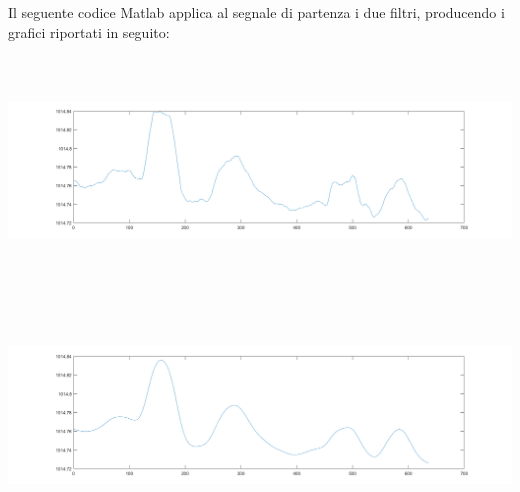 \documentclass[a4paper]{article}
\begin{document}
Il seguente codice Matlab applica al segnale di partenza i due filtri, producendo i grafici riportati in seguito: \\

\makebox[\linewidth]{}
\makebox[\linewidth]{}
\begin{minipage}{\linewidth}
\begin{center}
\includegraphics[width=160mm, height= 60mm]{./images/segnali/pressure_phone_movmean.png} 
\end{center}
\end{minipage}
\makebox[\linewidth]{}
\makebox[\linewidth]{}
\makebox[\linewidth]{}
\makebox[\linewidth]{}
\begin{minipage}{\linewidth}
\begin{center}
\includegraphics[width=160mm, height= 60mm]{./images/segnali/pressure_phone_gauss.png} 
\end{center}
\end{minipage}



\clearpage

\end{document}
